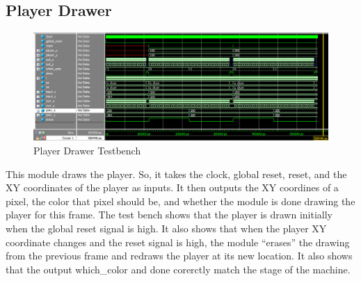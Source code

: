 \documentclass[11pt, titlepage]{article}
\begin{document}
        \subsection{Player Drawer}
            \begin{figure}[H]
                \centering
                \includegraphics[scale = 0.53]{Images/Testbench Player Drawer.png}
                \caption{Player Drawer Testbench}
            \end{figure}
            This module draws the player. So, it takes the clock, global reset, reset, and the XY coordinates of the player as inputs. It then outputs the XY coordines of a pixel, the color that pixel should be, and whether the module is done drawing the player for this frame. The test bench shows that the player is drawn initially when the global reset signal is high. It also shows that when the player XY coordinate changes and the reset signal is high, the module ``erases'' the drawing from the previous frame and redraws the player at its new location. It also shows that the output which\_color and done corerctly match the stage of the machine.
\end{document}
